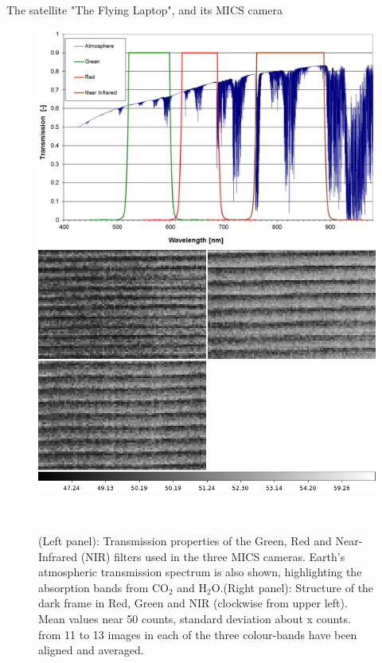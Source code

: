 \documentclass[final,hyperref={pdfpagelabels=false}]{beamer}
\begin{document}
\begin{frame}[t]
\begin{columns}[t]
\begin{column}{.23\textwidth}
\begin{block}{The satellite "The Flying Laptop", and its MICS camera}
\begin{figure}
    \centering
    \includegraphics[scale=0.41]{fig/mics_filter_characteristics.png}
    \includegraphics[scale=0.41]{fig/ripplefig.png}
    \caption{(Left panel): Transmission properties of the Green, Red and Near-Infrared (NIR) filters used in the three MICS cameras. Earth's atmospheric transmission spectrum is also shown, highlighting the absorption bands from CO$_2$ and H$_2$O.(Right panel): Structure of the dark frame in Red, Green and NIR (clockwise from upper left). Mean values near 50 counts, standard deviation about x counts. from 11 to 13 images in each of the three colour-bands have been aligned and averaged. }
    ~\label{fig:filterfig}
\end{figure}

\end{block}




\end{column}
\end{columns}
\end{frame}
\end{document}
